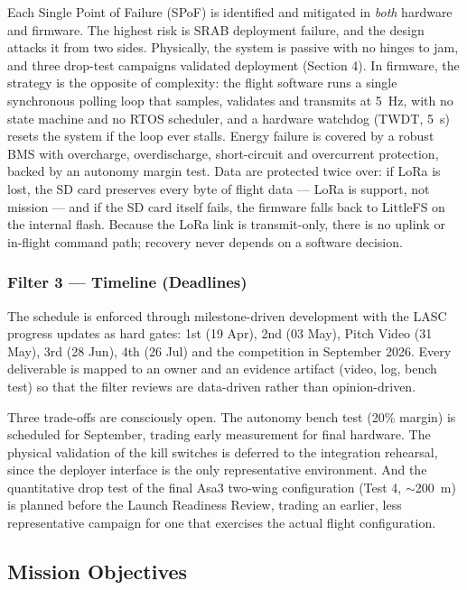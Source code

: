 Each Single Point of Failure (SPoF) is identified and mitigated in
\emph{both} hardware and firmware. The highest risk is SRAB deployment
failure, and the design attacks it from two sides. Physically, the
system is passive with no hinges to jam, and three drop-test campaigns
validated deployment (Section 4). In firmware, the strategy is the opposite of
complexity: the flight software runs a single synchronous polling loop
that samples, validates and transmits at 5~Hz, with no state machine
and no RTOS scheduler, and a hardware watchdog (TWDT, 5~s) resets the
system if the loop ever stalls. Energy failure is covered by a robust
BMS with overcharge, overdischarge, short-circuit and overcurrent
protection, backed by an autonomy margin test. Data are protected twice
over: if LoRa is lost, the SD card preserves every byte of flight data
--- LoRa is support, not mission --- and if the SD card itself fails,
the firmware falls back to LittleFS on the internal flash. Because the
LoRa link is transmit-only, there is no uplink or in-flight command
path; recovery never depends on a software decision.

\subsubsection{Filter 3 — Timeline (Deadlines)}

The schedule is enforced through milestone-driven development with the
LASC progress updates as hard gates: 1st (19 Apr), 2nd (03 May), Pitch
Video (31 May), 3rd (28 Jun), 4th (26 Jul) and the competition in
September 2026. Every deliverable is mapped to an owner and an
evidence artifact (video, log, bench test) so that the filter reviews
are data-driven rather than opinion-driven.

Three trade-offs are consciously open. The autonomy bench test (20\%
margin) is scheduled for September, trading early measurement for
final hardware. The physical validation of the kill switches is
deferred to the integration rehearsal, since the deployer interface is
the only representative environment. And the quantitative drop test of
the final Asa3 two-wing configuration (Test 4, $\sim$200~m) is planned
before the Launch Readiness Review, trading an earlier, less
representative campaign for one that exercises the actual flight
configuration.

\subsection{Mission Objectives}

